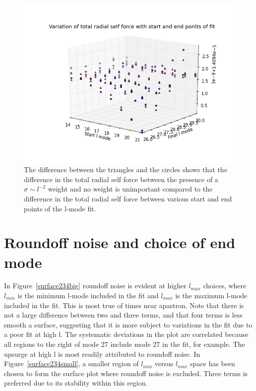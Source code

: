 \begin{figure}
  \includegraphics{3Dscatterwithwithoutsigmalminlmax}
  \caption{The difference between the triangles and the circles shows that the difference in the total radial self force between the presence of a $\sigma\sim l^{-2}$ weight and no weight is unimportant compared to the difference in the total radial self force between various start and end points of the l-mode fit.}
  \label{scatterfig}
\end{figure}

\section{Roundoff noise and choice of end mode}

In Figure~\ref{surface234big} roundoff noise is evident at higher $l_{max}$ choices, where $l_{min}$ is the minimum l-mode included in the fit and $l_{max}$ is the maximum l-mode included in the fit. This is most true of times near apastron. Note that there is not a large difference between two and three terms, and that four terms is less smooth a surface, suggesting that it is more subject to variations in the fit due to a poor fit at high l. The systematic deviations in the plot are correlated because all regions to the right of mode 27 include mode 27 in the fit, for example. The upsurge at high l is most readily attributed to roundoff noise. In Figure~\ref{surface234small}, a smaller region of $l_{min}$ versus $l_{max}$ space has been chosen to form the surface plot where roundoff noise is excluded. Three terms is preferred due to its stability within this region.

